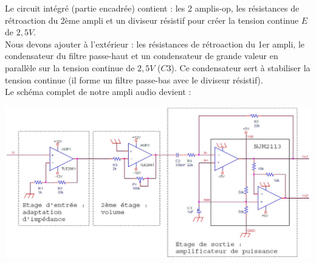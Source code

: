 \documentclass{../template/labo}
\begin{document}
Le circuit intégré (partie encadrée) contient : les 2 amplis-op, les résistances de rétroaction du 2ème ampli et un diviseur résistif pour créer la tension continue $E$ de $2,5V$.\\
Nous devons ajouter à l'extérieur : les résistances de rétroaction du 1er ampli, le condensateur du filtre passe-haut et un condensateur de grande valeur en parallèle sur la tension continue de $2,5V$ ($C3$). Ce condensateur sert à stabiliser la tension continue (il forme un filtre passe-bas avec le diviseur résistif).\\
Le schéma complet de notre ampli audio devient :
\begin{center}
\includegraphics[width=16cm]{figures/AOP3etages}
\end{center}
\end{document}
